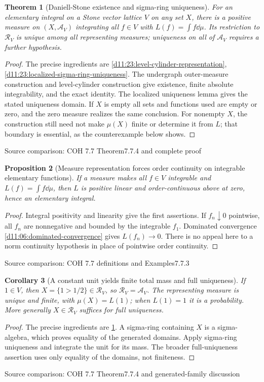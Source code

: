 \documentclass[11pt,oneside,openany]{book}
\newtheorem{theorem}{Theorem}[chapter]
\newtheorem{proposition}[theorem]{Proposition}
\newtheorem{corollary}[theorem]{Corollary}
\theoremstyle{definition}
\theoremstyle{remark}
\newcommand{\family}[1]{}
\newcommand{\source}[1]{\par\begingroup\small\sffamily\color{black!65}Source comparison: #1\par\endgroup}
\begin{document}
\begin{theorem}[Daniell-Stone existence and sigma-ring uniqueness]\family{D11.23.daniell_stone_representation}\label{d11:23:daniell-stone-representation}
For an elementary integral on a Stone vector lattice $V$ on any set $X$, there is a positive measure on $(X,\mathcal A_V)$ integrating all $f\in V$ with $L(f)=\int f\dd\mu$. Its restriction to $\mathcal R_V$ is unique among all representing measures; uniqueness on all of $\mathcal A_V$ requires a further hypothesis.
\end{theorem}
\begin{proof}
The precise ingredients are \cref{d11:23:level-cylinder-representation}, \cref{d11:23:localized-sigma-ring-uniqueness}. The undergraph outer-measure construction and level-cylinder construction give existence, finite absolute integrability, and the exact identity. The localized uniqueness lemma gives the stated uniqueness domain. If $X$ is empty all sets and functions used are empty or zero, and the zero measure realizes the same conclusion. For nonempty $X$, the construction still need not make $\mu(X)$ finite or determine it from $L$; that boundary is essential, as the counterexample below shows.
\end{proof}
\source{COH 7.7 Theorem7.7.4 and complete proof}

\begin{proposition}[Measure representation forces order continuity on integrable elementary functions]\family{D11.23.order_continuity_necessary}\label{d11:23:order-continuity-necessary}
If a measure makes all $f\in V$ integrable and $L(f)=\int f\dd\mu$, then $L$ is positive linear and order-continuous above at zero, hence an elementary integral.
\end{proposition}
\begin{proof}
Integral positivity and linearity give the first assertions. If $f_n\downarrow0$ pointwise, all $f_n$ are nonnegative and bounded by the integrable $f_1$. Dominated convergence \cref{d11:06:dominated-convergence} gives $L(f_n)\to0$. There is no appeal here to a norm continuity hypothesis in place of pointwise order continuity.
\end{proof}
\source{COH 7.7 definitions and Examples7.7.3}

\begin{corollary}[A constant unit yields finite total mass and full uniqueness]\family{D11.23.unit_implies_finite_unique}\label{d11:23:unit-implies-finite-unique}
If $1\in V$, then $X=\{1>1/2\}\in\mathcal R_V$, so $\mathcal R_V=\mathcal A_V$. The representing measure is unique and finite, with $\mu(X)=L(1)$; when $L(1)=1$ it is a probability. More generally $X\in\mathcal R_V$ suffices for full uniqueness.
\end{corollary}
\begin{proof}
The precise ingredients are \cref{d11:23:daniell-stone-representation}. A sigma-ring containing $X$ is a sigma-algebra, which proves equality of the generated domains. Apply sigma-ring uniqueness and integrate the unit for its mass. The broader full-uniqueness assertion uses only equality of the domains, not finiteness.
\end{proof}
\source{COH 7.7 Theorem7.7.4 and generated-family discussion}
\end{document}
